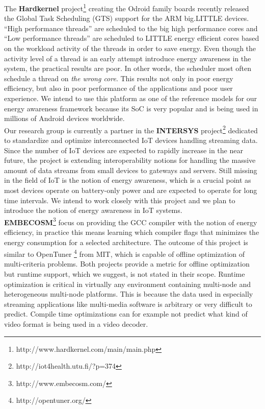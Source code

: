 \documentclass{article}
\begin{document}
The \textbf{Hardkernel} project\footnote{http://www.hardkernel.com/main/main.php} creating the Odroid family boards recently released the Global Task Scheduling (GTS) support for the ARM big.LITTLE devices. ``High performance threads'' are scheduled to the big high performance cores and ``Low performance threads'' are scheduled to LITTLE energy efficient cores based on the workload activity of the threads in order to save energy. 
Even though the activity level of a thread is an early attempt introduce energy awareness in the system, the practical results are poor. 
In other words, the scheduler most often schedule a thread on \textit{the wrong core}. 
This results not only in poor energy efficiency, but also in poor performance of the applications and poor user experience. 
We intend to use this platform as one of the reference models for our energy awareness framework because its SoC is very popular and is being used in millions of Android devices worldwide.\\

Our research group is currently a partner in the \textbf{INTERSYS} project\footnote{http://iot4health.utu.fi/?p=374} dedicated to standardize and optimize interconnected IoT devices handling streaming data. Since the number of IoT devices are expected to rapidly increase in the near future, the project is extending interoperability notions for handling the massive amount of data streams from small devices to gateways and servers. 
Still missing in the field of IoT is the notion of energy awareness, which is a crucial point as most devices operate on battery-only power and are expected to operate for long time intervals. 
We intend to work closely with this project and we plan to introduce the notion of energy awareness in IoT systems.\\

\textbf{EMBECOSM}\footnote{http://www.embecosm.com/} focus on providing the GCC compiler with the notion of energy efficiency, in practice this means learning which compiler flags that minimizes the energy consumption for a selected architecture. 
The outcome of this project is similar to OpenTuner \footnote{http://opentuner.org/} from MIT, which is capable of offline optimization of multi-criteria problems. 
Both projects provide a metric for offline optimization but runtime support, which we suggest, is not stated in their scope. 
Runtime optimization is critical in virtually any environment containing multi-node and heterogeneous multi-node platforms. 
This is because the data used in especially streaming applications like multi-media software is arbitrary or very difficult to predict. 
Compile time optimizations can for example not predict what kind of video format is being used in a video decoder.\\
\end{document}
